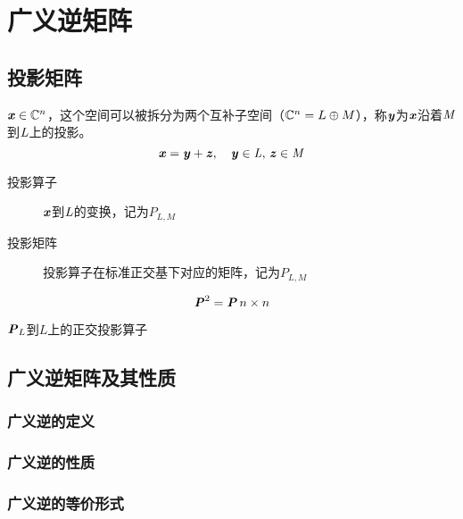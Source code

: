 \chapter{广义逆矩阵}
\label{cha:广义逆矩阵}

\section{投影矩阵}
\label{sec:投影矩阵}

\begin{definition}[投影矩阵]
    $\boldsymbol{\mathit{x}} \in \mathbb{C}^{n}$，这个空间可以被拆分为两个互补子空间（$\mathbb{C}^n = L \oplus M$），称$\boldsymbol{\mathit{y}}$为$\boldsymbol{\mathit{x}}$沿着$\mathit{M}$到$\mathit{L}$上的投影。
    $$
    \boldsymbol{\mathit{x}} = \boldsymbol{\mathit{y}} + \boldsymbol{\mathit{z}}, \quad \boldsymbol{\mathit{y}} \in \mathit{L},\, \boldsymbol{\mathit{z}} \in \mathit{M}
    $$

    \begin{description}
        \item[投影算子] $\boldsymbol{\mathit{x}}$到$\mathit{L}$的变换，记为$P_{L,M}$
        \item[投影矩阵] 投影算子在标准正交基下对应的矩阵，记为$P_{L,M}$
    \end{description}
\end{definition}

\begin{definition}[幂等矩阵]
    $$
    \boldsymbol{\mathit{P}}^2 = \boldsymbol{\mathit{P}}\, n \times n
    $$
\end{definition}

\begin{definition}
    $\boldsymbol{\mathit{P}}_L$\quad 到$L$上的正交投影算子
\end{definition}

\section{广义逆矩阵及其性质}
\label{sec:广义逆矩阵及其性质}

\subsection{广义逆的定义}
\label{sub:广义逆的定义}

\begin{definition}
\end{definition}

\subsection{广义逆的性质}
\label{sub:广义逆的性质}

\subsection{广义逆的等价形式}
\label{sub:广义逆的等价形式}

